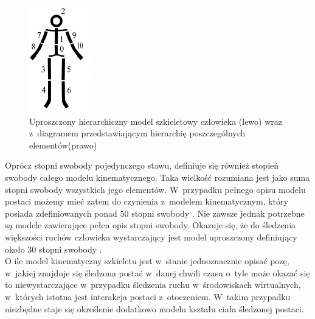 \begin{savenotes}
	\begin{figure}[!htb]
		\centering
		\begin{minipage}{.2\textwidth}
			\centering
			\includegraphics{images/hierarchical-structure.png}       
		\end{minipage}%
		\begin{minipage}{0.8\textwidth}
			\centering
			\scalebox{0.8}{
				
			}
		\end{minipage}
		\caption[Uproszczony hierarchiczny model szkieletowy człowieka wraz z~diagramem przedstawiającym hierarchię poszczególnych elementów]{Uproszczony hierarchiczny model szkieletowy człowieka (lewo) wraz z~diagramem przedstawiającym hierarchię poszczególnych elementów(prawo)\cite{Kwolek2014}}
		\label{fig:literature:skeletonModelHierarchy}
	\end{figure}
\end{savenotes}
													
Oprócz stopni swobody pojedynczego stawu, definiuje się również stopień swobody całego modelu kinematycznego. Taka wielkość rozumiana jest jako suma stopni swobody wszystkich jego elementów. W~przypadku pełnego opisu modelu postaci możemy mieć zatem do czynienia z~modelem kinematycznym, który posiada zdefiniowanych ponad 50 stopni swobody \cite{Agarwal2006}. Nie zawsze jednak potrzebne są modele zawierające pełen opis stopni swobody. Okazuje się, że do śledzenia większości ruchów człowieka wystarczający jest model uproszczony definiujący około 30 stopni swobody \cite{Sigal2006,Kwolek2011}.\\
													
O ile model kinematyczny szkieletu jest w~stanie jednoznacznie opisać pozę, w~jakiej znajduje się śledzona postać w~danej chwili czasu o~tyle może okazać się to niewystarczające w~przypadku śledzenia ruchu w~środowiskach wirtualnych, w~których istotna jest interakcja postaci z~otoczeniem. W~takim przypadku niezbędne staje się określenie dodatkowo modelu kształu ciała śledzonej postaci.
															
